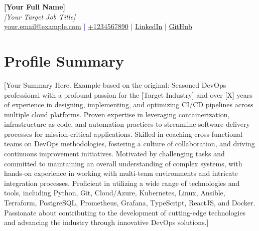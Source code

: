 \documentclass[a4paper,10pt]{article}
\begin{document}
\pagestyle{empty} %

\begin{center}
{\LARGE \textbf{[Your Full Name]}}\\[10pt]
{\Large \textit{[Your Target Job Title]}}\\[10pt]
\textcolor{darkblue}{\href{mailto:your.email@example.com}{your.email@example.com} | \href{tel:+1234567890}{+1234567890} | \href{https://www.linkedin.com/in/yourprofile/}{LinkedIn} | \href{https://github.com/yourusername}{GitHub}}
\end{center}

\section*{Profile Summary}
[Your Summary Here. Example based on the original: Seasoned DevOps professional with a profound passion for the [Target Industry] and over [X] years of experience in designing, implementing, and optimizing CI/CD pipelines across multiple cloud platforms. Proven expertise in leveraging containerization, infrastructure as code, and automation practices to streamline software delivery processes for mission-critical applications. Skilled in coaching cross-functional teams on DevOps methodologies, fostering a culture of collaboration, and driving continuous improvement initiatives. Motivated by challenging tasks and committed to maintaining an overall understanding of complex systems, with hands-on experience in working with multi-team environments and intricate integration processes. Proficient in utilizing a wide range of technologies and tools, including Python, Git, Cloud/Azure, Kubernetes, Linux, Ansible, Terraform, PostgreSQL, Prometheus, Grafana, TypeScript, ReactJS, and Docker. Passionate about contributing to the development of cutting-edge technologies and advancing the industry through innovative DevOps solutions.]

\end{document}
